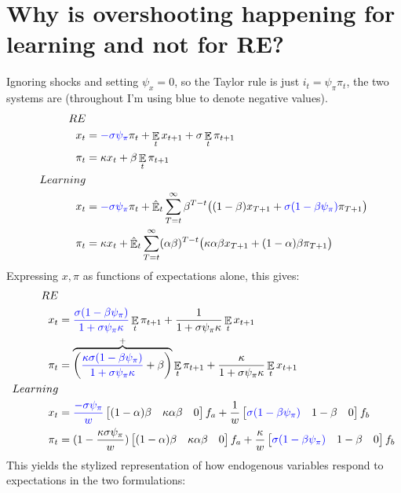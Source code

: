 \documentclass[11pt]{article}
\renewcommand{\[}{\begin{equation}}
\renewcommand{\]}{\end{equation}}
\DeclareMathOperator{\E}{\mathbb{E}}
\begin{document}
\newpage
\section{Why is overshooting happening for learning and not for RE?}
Ignoring shocks and setting $\psi_x = 0$, so the Taylor rule is just $i_t =  \psi_{\pi}\pi_t$, the two systems are
(throughout I'm using blue to denote negative values).
\begin{align*}
RE& \\
x_t &= \textcolor{blue}{- \sigma \psi_{\pi}} \pi_t+  \E_t x_{t+1}   + \sigma \E_t \pi_{t+1}  \\
\pi_t &= \kappa x_t +\beta \E_t \pi_{t+1} \\
Learning & \\
x_t &= \textcolor{blue}{ -\sigma \psi_{\pi}} \pi_t +\hat{\E}_t \sum_{T=t}^{\infty} \beta^{T-t }\big( (1-\beta) x_{T+1} + \textcolor{blue}{\sigma(1- \beta \psi_{\pi})}\pi_{T+1} \big)  \\
\pi_t &= \kappa x_t +\hat{\E}_t \sum_{T=t}^{\infty} (\alpha\beta)^{T-t }\big( \kappa \alpha \beta x_{T+1} + (1-\alpha)\beta \pi_{T+1} \big)
\end{align*}
Expressing $x, \pi$ as functions of expectations alone, this gives:
\begin{align*}
RE& \\
x_t &=  \textcolor{blue}{ \frac{\sigma(1-\beta\psi_{\pi})}{1+\sigma\psi_{\pi}\kappa}}\E_t \pi_{t+1}   +   \frac{1}{1+\sigma\psi_{\pi}\kappa}\E_t x_{t+1}  \\
\pi_t &=   \overbrace{\bigg( \textcolor{blue}{\frac{\kappa\sigma(1-\beta\psi_{\pi})}{1+\sigma\psi_{\pi}\kappa}}+\beta\bigg)}^{+}\E_t \pi_{t+1} +   \frac{\kappa}{1+\sigma\psi_{\pi}\kappa}\E_t x_{t+1} \\
Learning & \\
x_t & = \textcolor{blue}{\frac{-\sigma\psi_{\pi}}{w}} \begin{bmatrix} (1-\alpha)\beta&\kappa\alpha\beta & 0 \end{bmatrix} f_a + \frac{1}{w}\begin{bmatrix} \textcolor{blue}{\sigma(1-\beta\psi_{\pi})}&1-\beta & 0\end{bmatrix} f_b \\
\pi_t & = (1-\frac{\kappa\sigma\psi_{\pi}}{w}) \begin{bmatrix} (1-\alpha)\beta&\kappa\alpha\beta & 0 \end{bmatrix} f_a + \frac{\kappa}{w}\begin{bmatrix}  \textcolor{blue}{\sigma(1-\beta\psi_{\pi})}&1-\beta & 0\end{bmatrix} f_b
\end{align*}
This yields the stylized representation of how endogenous variables respond to expectations in the two formulations:
\end{document}
